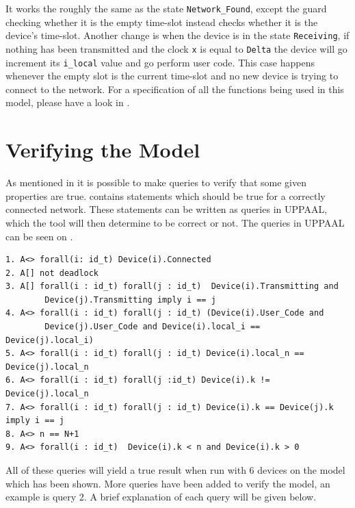 It works the roughly the same as the state \texttt{Network\_Found}, except the guard checking whether it is the empty time-slot instead checks whether it is the device's time-slot.
Another change is when the device is in the state \texttt{Receiving}, if nothing has been transmitted and the clock \texttt{x} is equal to \texttt{Delta} the device will go increment its \texttt{i\_local} value and go perform user code. 
This case happens whenever the empty slot is the current time-slot and no new device is trying to connect to the network.
For a specification of all the functions being used in this model, please have a look in .

\section{Verifying the Model}

As mentioned in  it is possible to make queries to verify that some given properties are true.
 contains statements which should be true for a correctly connected network.
These statements can be written as queries in UPPAAL, which the tool will then determine to be correct or not. 
The queries in UPPAAL can be seen on .

\begin{lstlisting}[language={[GUI]Uppaal}, % use GUI flavor
columns={[l]flexible},
frameround=fftt, frame=shadowbox, rulesepcolor=\color{gray},label=lst:UPPAAL_Queries,
caption={Queries for the UPPAAL Model}]
1. A<> forall(i: id_t) Device(i).Connected
2. A[] not deadlock
3. A[] forall(i : id_t) forall(j : id_t)  Device(i).Transmitting and 
		Device(j).Transmitting imply i == j
4. A<> forall(i : id_t) forall(j : id_t) (Device(i).User_Code and 
		Device(j).User_Code and Device(i).local_i == Device(j).local_i)
5. A<> forall(i : id_t) forall(j : id_t) Device(i).local_n == Device(j).local_n
6. A<> forall(i : id_t) forall(j :id_t) Device(i).k != Device(j).local_n
7. A<> forall(i : id_t) forall(j : id_t) Device(i).k == Device(j).k imply i == j
8. A<> n == N+1
9. A<> forall(i : id_t)  Device(i).k < n and Device(i).k > 0
\end{lstlisting}

All of these queries will yield a true result when run with 6 devices on the model which has been shown.
More queries have been added to verify the model, an example is query 2.
A brief explanation of each query will be given below. 

